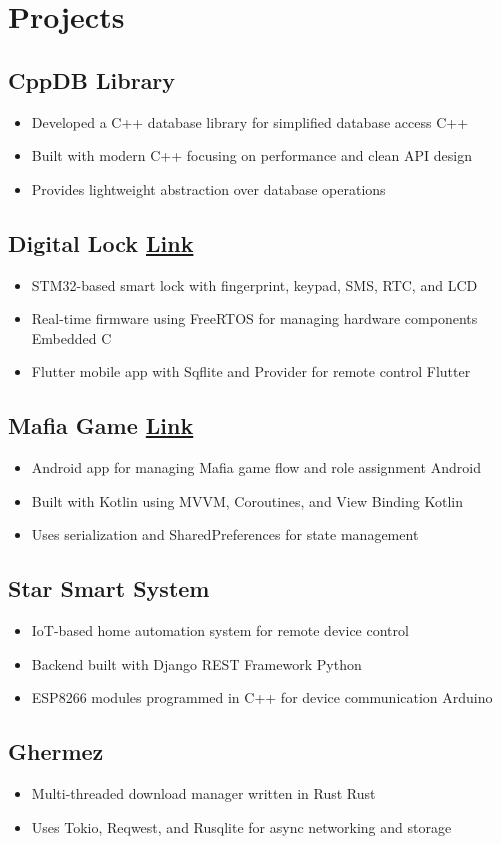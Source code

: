 \documentclass[12pt]{article}
\begin{document}
\section{Projects}
\subsection{CppDB Library}
\begin{itemize}
  \item Developed a C++ database library for simplified database
    access {\hfill C++}
  \item Built with modern C++ focusing on performance and clean API design
  \item Provides lightweight abstraction over database operations
\end{itemize}

\subsection{Digital Lock {\normalfont \textbar{}
\href{https://github.com/lamRezaMousavi/digital-lock}{Link}}}
\begin{itemize}
  \item STM32-based smart lock with fingerprint, keypad, SMS, RTC, and LCD
  \item Real-time firmware using FreeRTOS for managing hardware
    components {\hfill Embedded C}
  \item Flutter mobile app with Sqflite and Provider for remote
    control {\hfill Flutter}
\end{itemize}

\subsection{Mafia Game {\normalfont \textbar{}
\href{https://github.com/lamRezaMousavi/Mafia}{Link}}}
\begin{itemize}
  \item Android app for managing Mafia game flow and role assignment
    {\hfill Android}
  \item Built with Kotlin using MVVM, Coroutines, and View Binding
    {\hfill Kotlin}
  \item Uses serialization and SharedPreferences for state management
\end{itemize}

\subsection{Star Smart System}
\begin{itemize}
  \item IoT-based home automation system for remote device control
  \item Backend built with Django REST Framework {\hfill Python}
  \item ESP8266 modules programmed in C++ for device communication
    {\hfill Arduino}
\end{itemize}

\subsection{Ghermez}
\begin{itemize}
  \item Multi-threaded download manager written in Rust {\hfill Rust}
  \item Uses Tokio, Reqwest, and Rusqlite for async networking and storage
\end{itemize}
\end{document}
